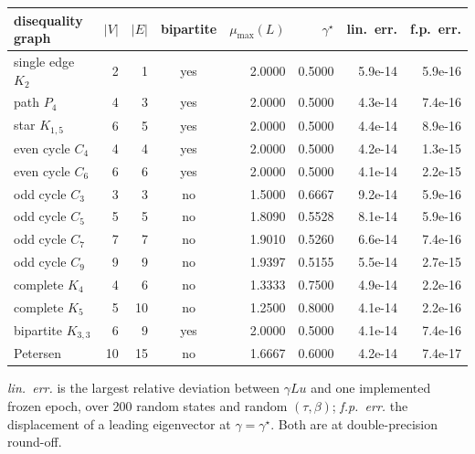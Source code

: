 \begin{table}[htbp]
{\footnotesize\begin{tabular}{lrrcrrrr}
\toprule
disequality graph & $|V|$ & $|E|$ & bipartite & $\mu_{\max}(L)$ & $\gamma^\star$ & lin.\ err. & f.p.\ err. \\
\midrule
single edge $K_2$ & 2 & 1 & yes & 2.0000 & 0.5000 & 5.9e-14 & 5.9e-16 \\
path $P_4$ & 4 & 3 & yes & 2.0000 & 0.5000 & 4.3e-14 & 7.4e-16 \\
star $K_{1,5}$ & 6 & 5 & yes & 2.0000 & 0.5000 & 4.4e-14 & 8.9e-16 \\
even cycle $C_4$ & 4 & 4 & yes & 2.0000 & 0.5000 & 4.2e-14 & 1.3e-15 \\
even cycle $C_6$ & 6 & 6 & yes & 2.0000 & 0.5000 & 4.1e-14 & 2.2e-15 \\
odd cycle $C_3$ & 3 & 3 & no & 1.5000 & 0.6667 & 9.2e-14 & 5.9e-16 \\
odd cycle $C_5$ & 5 & 5 & no & 1.8090 & 0.5528 & 8.1e-14 & 5.9e-16 \\
odd cycle $C_7$ & 7 & 7 & no & 1.9010 & 0.5260 & 6.6e-14 & 7.4e-16 \\
odd cycle $C_9$ & 9 & 9 & no & 1.9397 & 0.5155 & 5.5e-14 & 2.7e-15 \\
complete $K_4$ & 4 & 6 & no & 1.3333 & 0.7500 & 4.9e-14 & 2.2e-16 \\
complete $K_5$ & 5 & 10 & no & 1.2500 & 0.8000 & 4.1e-14 & 2.2e-16 \\
bipartite $K_{3,3}$ & 6 & 9 & yes & 2.0000 & 0.5000 & 4.1e-14 & 7.4e-16 \\
Petersen & 10 & 15 & no & 1.6667 & 0.6000 & 4.2e-14 & 7.4e-17 \\
\bottomrule
\end{tabular}}
{\emph{lin.\ err.} is the largest relative deviation between $\gamma Lu$ and one implemented frozen epoch, over 200 random states and random $(\tau,\beta)$; \emph{f.p.\ err.} the displacement of a leading eigenvector at $\gamma=\gamma^\star$. Both are at double-precision round-off.}
\end{table}
